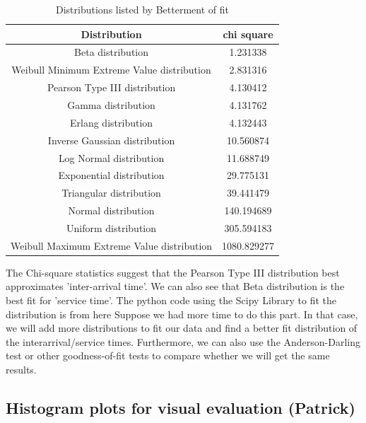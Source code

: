 \documentclass{article}
\begin{document}
\begin{table}[H]
    \caption{Distributions listed by Betterment of fit}
    \label{tab:Service Best Fit}
    \begin{center}
    \begin{tabular}{c S}
        \toprule
        \textbf{Distribution} & \textbf{chi square}\\
        \midrule
        Beta distribution & 1.231338\\
        Weibull Minimum Extreme Value distribution & 2.831316\\
        Pearson Type III distribution & 4.130412\\
        Gamma distribution & 4.131762\\
        Erlang distribution & 4.132443\\
        Inverse Gaussian distribution & 10.560874\\
        Log Normal distribution & 11.688749\\
        Exponential distribution & 29.775131\\
        Triangular distribution & 39.441479\\
        Normal distribution & 140.194689\\
        Uniform distribution & 305.594183\\
        Weibull Maximum Extreme Value distribution & 1080.829277\\
        \bottomrule
    \end{tabular}
    \end{center}
\end{table}

The Chi-square statistics suggest that the Pearson Type III distribution best approximates 'inter-arrival time'. We can also see that Beta distribution is the best fit for 'service time'. The python code using the Scipy Library to fit the distribution is from here\cite{git} Suppose we had more time to do this part. In that case, we will add more distributions to fit our data and find a better fit distribution of the interarrival/service times. Furthermore, we can also use the Anderson-Darling test or other goodness-of-fit tests to compare whether we will get the same results.

\subsection{Histogram plots for visual evaluation (Patrick)}
\end{document}
